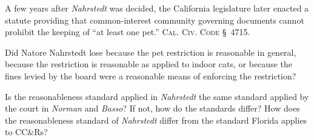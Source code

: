 

\item A few years after \textit{Nahrstedt} was decided, the California
legislature later enacted a statute providing that common-interest community
governing documents cannot prohibit the keeping of ``at least one pet.''
\textsc{Cal. Civ. Code} \S~4715.

\item Did Natore Nahrstedt lose because the pet restriction is reasonable in
general, because the restriction is reasonable as applied to indoor cats, or
because the fines levied by the board were a reasonable means of enforcing the
restriction?

\item Is the reasonableness standard applied in \textit{Nahrstedt} the same
standard applied by the court in \textit{Norman} and \textit{Basso}? If not, how
do the standards differ? How does the reasonableness standard of
\textit{Nahrstedt} differ from the standard Florida applies to CC\&Rs?


